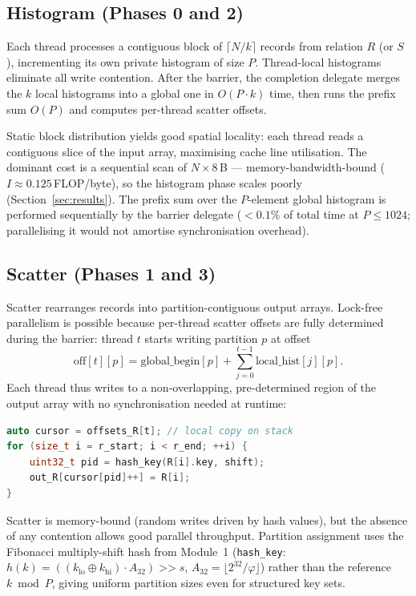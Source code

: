 \documentclass[10pt,a4paper,twocolumn]{article}
\begin{document}
\subsection*{Histogram (Phases 0 and 2)}

Each thread processes a contiguous block of $\lceil N/k \rceil$ records from relation $R$ (or $S$), incrementing its own private histogram of size $P$. Thread-local histograms eliminate all write contention. After the barrier, the completion delegate merges the $k$ local histograms into a global one in $O(P \cdot k)$ time, then runs the prefix sum $O(P)$ and computes per-thread scatter offsets.

Static block distribution yields good spatial locality: each thread reads a contiguous slice of the input array, maximising cache line utilisation. The dominant cost is a sequential scan of $N \times 8$\,B --- memory-bandwidth-bound ($I \approx 0.125$\,FLOP/byte), so the histogram phase scales poorly (Section~\ref{sec:results}). The prefix sum over the $P$-element global histogram is performed sequentially by the barrier delegate ($< 0.1\%$ of total time at $P \leq 1024$; parallelising it would not amortise synchronisation overhead).

\subsection*{Scatter (Phases 1 and 3)}

Scatter rearranges records into partition-contiguous output arrays. Lock-free parallelism is possible because per-thread scatter offsets are fully determined during the barrier: thread $t$ starts writing partition $p$ at offset
\[
  \text{off}[t][p] = \text{global\_begin}[p] + \sum_{j=0}^{t-1} \text{local\_hist}[j][p].
\]
Each thread thus writes to a non-overlapping, pre-determined region of the output array with no synchronisation needed at runtime:

\noindent\begin{minipage}{\linewidth}
\begin{lstlisting}[language=C++]
auto cursor = offsets_R[t]; // local copy on stack
for (size_t i = r_start; i < r_end; ++i) {
    uint32_t pid = hash_key(R[i].key, shift);
    out_R[cursor[pid]++] = R[i];
}
\end{lstlisting}
\end{minipage}

Scatter is memory-bound (random writes driven by hash values), but the absence of any contention allows good parallel throughput. Partition assignment uses the Fibonacci multiply-shift hash from Module~1 (\texttt{hash\_key}: $h(k)=((k_\text{lo}\oplus k_\text{hi})\cdot A_{32})\mathop{>>}s$, $A_{32}=\lfloor 2^{32}/\varphi\rfloor$) rather than the reference $k\bmod P$, giving uniform partition sizes even for structured key sets.
\end{document}
